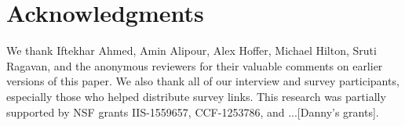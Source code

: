 \section*{Acknowledgments}

We thank Iftekhar Ahmed, Amin Alipour, Alex Hoffer, Michael Hilton, Sruti Ragavan, and the anonymous reviewers for their valuable comments on earlier versions of this paper.
We also thank all of our interview and survey participants, especially those who helped distribute survey links.
This research was partially supported by NSF grants IIS-1559657, CCF-1253786, and ...[Danny's grants].
